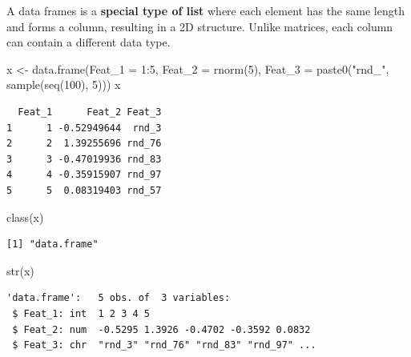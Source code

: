 \documentclass[
]{book}
\newenvironment{Shaded}{\begin{snugshade}}{\end{snugshade}}
\newcommand{\AttributeTok}[1]{\textcolor[rgb]{0.77,0.63,0.00}{#1}}
\newcommand{\DecValTok}[1]{\textcolor[rgb]{0.00,0.00,0.81}{#1}}
\newcommand{\FunctionTok}[1]{\textcolor[rgb]{0.00,0.00,0.00}{#1}}
\newcommand{\NormalTok}[1]{#1}
\newcommand{\OtherTok}[1]{\textcolor[rgb]{0.56,0.35,0.01}{#1}}
\newcommand{\SpecialCharTok}[1]{\textcolor[rgb]{0.00,0.00,0.00}{#1}}
\newcommand{\StringTok}[1]{\textcolor[rgb]{0.31,0.60,0.02}{#1}}
\begin{document}
\begin{rmdnote}
A data frames is a \textbf{special type of list} where each element has
the same length and forms a column, resulting in a 2D structure. Unlike
matrices, each column can contain a different data type.
\end{rmdnote}

\begin{Shaded}
\begin{Highlighting}[]
\NormalTok{x }\OtherTok{\textless{}{-}} \FunctionTok{data.frame}\NormalTok{(}\AttributeTok{Feat\_1 =} \DecValTok{1}\SpecialCharTok{:}\DecValTok{5}\NormalTok{,}
                \AttributeTok{Feat\_2 =} \FunctionTok{rnorm}\NormalTok{(}\DecValTok{5}\NormalTok{),}
                \AttributeTok{Feat\_3 =} \FunctionTok{paste0}\NormalTok{(}\StringTok{"rnd\_"}\NormalTok{, }\FunctionTok{sample}\NormalTok{(}\FunctionTok{seq}\NormalTok{(}\DecValTok{100}\NormalTok{), }\DecValTok{5}\NormalTok{)))}
\NormalTok{x}
\end{Highlighting}
\end{Shaded}

\begin{verbatim}
  Feat_1      Feat_2 Feat_3
1      1 -0.52949644  rnd_3
2      2  1.39255696 rnd_76
3      3 -0.47019936 rnd_83
4      4 -0.35915907 rnd_97
5      5  0.08319403 rnd_57
\end{verbatim}

\begin{Shaded}
\begin{Highlighting}[]
\FunctionTok{class}\NormalTok{(x)}
\end{Highlighting}
\end{Shaded}

\begin{verbatim}
[1] "data.frame"
\end{verbatim}

\begin{Shaded}
\begin{Highlighting}[]
\FunctionTok{str}\NormalTok{(x)}
\end{Highlighting}
\end{Shaded}

\begin{verbatim}
'data.frame':   5 obs. of  3 variables:
 $ Feat_1: int  1 2 3 4 5
 $ Feat_2: num  -0.5295 1.3926 -0.4702 -0.3592 0.0832
 $ Feat_3: chr  "rnd_3" "rnd_76" "rnd_83" "rnd_97" ...
\end{verbatim}

\begin{Shaded}
\end{Shaded}
\end{document}
